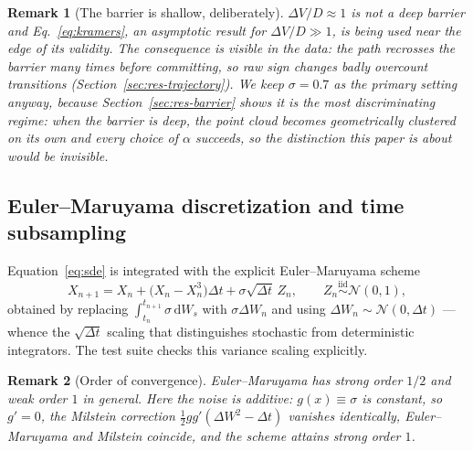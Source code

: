\documentclass[11pt]{article}
\newtheorem{remark}{Remark}
\newcommand{\dd}{\,\mathrm{d}}
\begin{document}
\begin{remark}[The barrier is shallow, deliberately]
$\Delta V/D \approx 1$ is not a deep barrier and Eq.~\eqref{eq:kramers}, an
asymptotic result for $\Delta V/D \gg 1$, is being used near the edge of its
validity. The consequence is visible in the data: the path recrosses the barrier
many times before committing, so raw sign changes badly overcount transitions
(Section~\ref{sec:res-trajectory}). We keep $\sigma = 0.7$ as the primary setting
anyway, because Section~\ref{sec:res-barrier} shows it is the \emph{most
discriminating} regime: when the barrier is deep, the point cloud becomes
geometrically clustered on its own and every choice of $\alpha$ succeeds, so the
distinction this paper is about would be invisible.
\end{remark}

\subsection{Euler--Maruyama discretization and time subsampling}
\label{sec:em}

Equation~\eqref{eq:sde} is integrated with the explicit Euler--Maruyama scheme
\citep{higham2001algorithmic,kloeden1992numerical}
\begin{equation}
X_{n+1} = X_n + \bigl(X_n - X_n^3\bigr)\Delta t + \sigma\sqrt{\Delta t}\,Z_n ,
\qquad Z_n \stackrel{\text{iid}}{\sim}\mathcal{N}(0,1) ,
\label{eq:em}
\end{equation}
obtained by replacing $\int_{t_n}^{t_{n+1}}\sigma\dd W_s$ with $\sigma\Delta W_n$
and using $\Delta W_n \sim \mathcal{N}(0,\Delta t)$ --- whence the
$\sqrt{\Delta t}$ scaling that distinguishes stochastic from deterministic
integrators. The test suite checks this variance scaling explicitly.

\begin{remark}[Order of convergence]
Euler--Maruyama has strong order $1/2$ and weak order $1$ in general. Here the
noise is \emph{additive}: $g(x)\equiv\sigma$ is constant, so $g'=0$, the Milstein
correction $\tfrac12 gg'(\Delta W^2 - \Delta t)$ vanishes identically,
Euler--Maruyama and Milstein coincide, and the scheme attains strong order $1$.
\end{remark}
\end{document}
